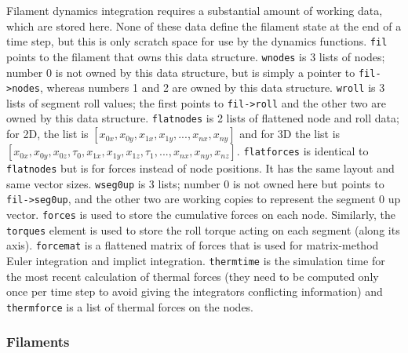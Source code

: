 \documentclass {scrbook}
\newcommand {\ttt} {\texttt}
\begin{document}
Filament dynamics integration requires a substantial amount of working data, which are stored here. None of these data define the filament state at the end of a time step, but this is only scratch space for use by the dynamics functions. \ttt{fil} points to the filament that owns this data structure. \ttt{wnodes} is 3 lists of nodes; number 0 is not owned by this data structure, but is simply a pointer to \ttt{fil->nodes}, whereas numbers 1 and 2 are owned by this data structure. \ttt{wroll} is 3 lists of segment roll values; the first points to \ttt{fil->roll} and the other two are owned by this data structure. \ttt{flatnodes} is 2 lists of flattened node and roll data; for 2D, the list is $[x_{0x},x_{0y},x_{1x},x_{1y},...,x_{nx},x_{ny}]$ and for 3D the list is $[x_{0x},x_{0y},x_{0z},\tau_{0},x_{1x},x_{1y},x_{1z},\tau_1,...,x_{nx},x_{ny},x_{nz}]$. \ttt{flatforces} is identical to \ttt{flatnodes} but is for forces instead of node positions. It has the same layout and same vector sizes. \ttt{wseg0up} is 3 lists; number 0 is not owned here but points to \ttt{fil->seg0up}, and the other two are working copies to represent the segment 0 up vector. \ttt{forces} is used to store the cumulative forces on each node. Similarly, the \ttt{torques} element is used to store the roll torque acting on each segment (along its axis). \ttt{forcemat} is a flattened matrix of forces that is used for matrix-method Euler integration and implict integration. \ttt{thermtime} is the simulation time for the most recent calculation of thermal forces (they need to be computed only once per time step to avoid giving the integrators conflicting information) and \ttt{thermforce} is a list of thermal forces on the nodes.


\subsubsection{Filaments}
\end{document}
